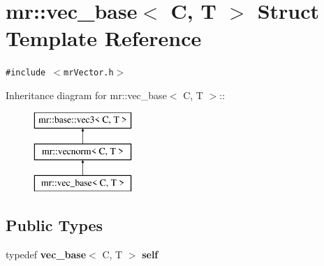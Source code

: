 \section{mr::vec\_\-base$<$ C, T $>$ Struct Template Reference}
\label{structmr_1_1vec__base}
{\tt \#include $<$mr\-Vector.h$>$}

Inheritance diagram for mr::vec\_\-base$<$ C, T $>$::\begin{figure}[H]
\begin{center}
\leavevmode
\includegraphics[height=3cm]{structmr_1_1vec__base}
\end{center}
\end{figure}
\subsection*{Public Types}
\begin{CompactItemize}
\item 
typedef {\bf vec\_\-base}$<$ C, T $>$ {\bf self}
\end{CompactItemize}
